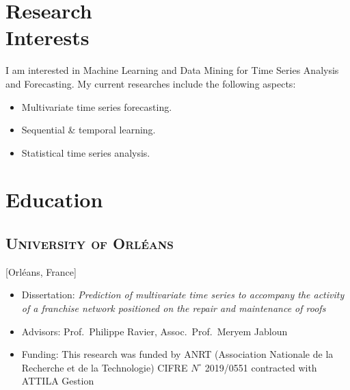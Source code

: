 \documentclass{mycv}
\begin{document}
\maketitle

\section{Research \\ Interests}

I am interested in Machine Learning and Data Mining for Time Series Analysis and Forecasting. My current researches include the following aspects:

\begin{itemize}
  \itemsep 0em
  \item Multivariate time series forecasting.
  \item Sequential \& temporal learning.
  \item Statistical time series analysis.
\end{itemize}

\vspace{-0.5em}

\section{Education}

\subsection{\scshape University of Orl\'eans}[Orl\'eans, France]

\begin{positions}
\end{positions}

\vspace{-\parskip}

\begin{itemize}[label={}]
  \itemsep 0em
  \item Dissertation: \textit{Prediction of multivariate time series to accompany the activity of a franchise network positioned on the repair and maintenance of roofs}
  \item Advisors: Prof.~Philippe Ravier, Assoc.~Prof.~Meryem Jabloun
  \item Funding: This research was funded by ANRT (Association Nationale de la Recherche et de la Technologie) CIFRE $N^{\circ}$ 2019/0551 contracted with ATTILA Gestion
\end{itemize}
\end{document}
